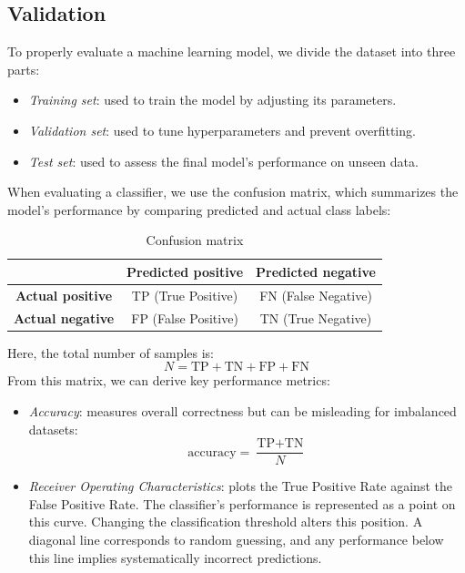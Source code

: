 \subsection{Validation}
To properly evaluate a machine learning model, we divide the dataset into three parts: 
\begin{itemize}
    \item \textit{Training set}: used to train the model by adjusting its parameters.
    \item \textit{Validation set}: used to tune hyperparameters and prevent overfitting.
    \item \textit{Test set}: used to assess the final model's performance on unseen data.
\end{itemize}
\noindent When evaluating a classifier, we use the confusion matrix, which summarizes the model's performance by comparing predicted and actual class labels:
\renewcommand{\arraystretch}{1.5}
\begin{table}[h]
    \centering
    \begin{tabular}{|c|cc|}
        \hline
         & \textbf{Predicted positive} & \textbf{Predicted negative} \\
        \hline
        \textbf{Actual positive} & TP (True Positive) & FN (False Negative) \\
        \textbf{Actual negative} & FP (False Positive) & TN (True Negative) \\ 
        \hline
    \end{tabular}
    \caption{Confusion matrix}
\end{table}
\renewcommand{\arraystretch}{1}

\noindent Here, the total number of samples is:
\[N=\text{TP}+\text{TN}+\text{FP}+\text{FN}\]
\noindent From this matrix, we can derive key performance metrics:

\begin{itemize}
    \item \textit{Accuracy}: measures overall correctness but can be misleading for imbalanced datasets: 
        \[\text{accuracy}=\dfrac{\text{TP}+\text{TN}}{N}\]
    \item \textit{Receiver Operating Characteristics}: plots the True Positive Rate against the False Positive Rate. 
        The classifier's performance is represented as a point on this curve. 
        Changing the classification threshold alters this position. 
        A diagonal line corresponds to random guessing, and any performance below this line implies systematically incorrect predictions.  
\end{itemize}

